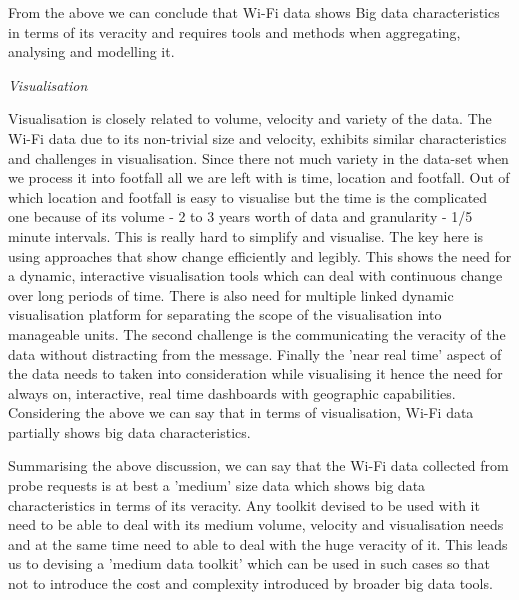 From the above we can conclude that Wi-Fi data shows Big data characteristics in terms of its veracity and requires tools and methods when aggregating, analysing and modelling it.


\vspace{1.5em}\noindent\textit{Visualisation}\vspace{0.5em}

Visualisation is closely related to volume, velocity and variety of the data.
The Wi-Fi data due to its non-trivial size and velocity, exhibits similar characteristics and challenges in visualisation.
Since there not much variety in the data-set when we process it into footfall all we are left with is time, location and footfall.
Out of which location and footfall is easy to visualise but the time is the complicated one because of its volume - 2 to 3 years worth of data and granularity - 1/5 minute intervals.
This is really hard to simplify and visualise.
The key here is using approaches that show change efficiently and legibly.
This shows the need for a dynamic, interactive visualisation tools which can deal with continuous change over long periods of time.
There is also need for multiple linked dynamic visualisation platform for separating the scope of the visualisation into manageable units.
The second challenge is the communicating the veracity of the data without distracting from the message.
Finally the 'near real time' aspect of the data needs to taken into consideration while visualising it hence the need for always on, interactive, real time dashboards with geographic capabilities.
Considering the above we can say that in terms of visualisation, Wi-Fi data partially shows big data characteristics.


Summarising the above discussion, we can say that the Wi-Fi data collected from probe requests is at best a 'medium' size data which shows big data characteristics in terms of its veracity.
Any toolkit devised to be used with it need to be able to deal with its medium volume, velocity and visualisation needs and at the same time need to able to deal with the huge veracity of it.
This leads us to devising a 'medium data toolkit' which can be used in such cases so that not to introduce the cost and complexity introduced by broader big data tools.



